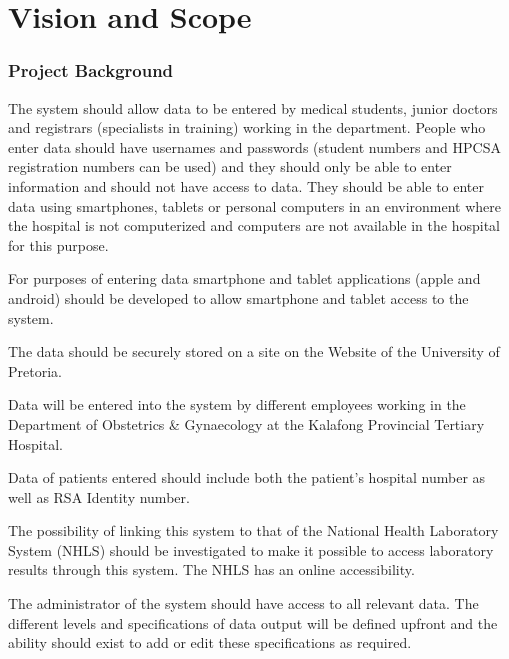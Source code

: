 \section{Vision and Scope}
\subsubsection{Project Background}
The system should allow data to be entered by medical students, junior doctors 
and  registrars  (specialists  in  training)  working  in  the  department.  People  who 
enter  data  should  have  usernames  and  passwords  (student  numbers  and 
HPCSA registration numbers can be used) and they should only be able to enter 
information  and  should  not  have  access  to  data.  They  should  be  able  to  enter 
data using smartphones, tablets or personal computers in an environment where 
the hospital is not computerized and computers are not available in the hospital 
for this purpose. \par 

For purposes  of  entering  data  smartphone and  tablet applications (apple  and 
android)  should be  developed  to  allow  smartphone  and  tablet  access  to  the 
system. \par

The data should be securely stored on a site on the Website of the University of 
Pretoria. \par

Data  will  be  entered  into  the  system  by  different  employees  working  in  the 
Department  of  Obstetrics  \&  Gynaecology  at  the  Kalafong  Provincial  Tertiary 
Hospital. \par

Data of patients entered should include both the patient’s hospital number as well 
as RSA Identity number. \par

The  possibility  of  linking  this  system  to  that  of  the  National  Health  Laboratory 
System (NHLS) should be investigated to make it possible to access laboratory 
results through this system. The NHLS has an online accessibility. \par

The  administrator  of  the  system  should  have  access  to  all  relevant  data.  The 
different levels and specifications of data output will be defined upfront and the 
ability should exist to add or edit these specifications as required. \par

